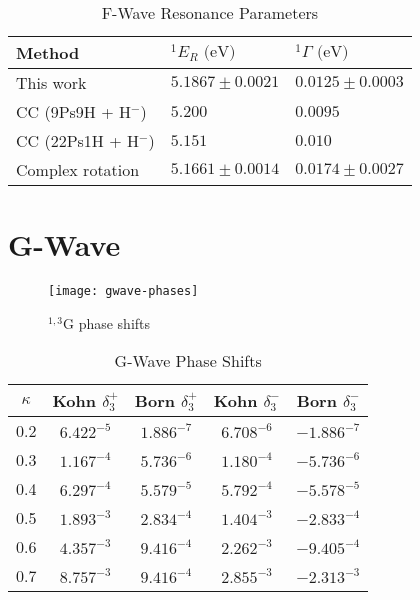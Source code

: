 \documentclass[Dissertation.tex]{subfiles}
\begin{document}
\setlength{\abovecaptionskip}{6pt}   %
\setlength{\belowcaptionskip}{6pt}   %
\begin{table}[H]
\centering
\begin{tabular}{l l l}
\toprule
Method & $^1E_R \text{ (eV)}$ & $^1\Gamma \text{ (eV)}$ \\
\midrule
This work & $5.1867 \pm 0.0021$ & $0.0125 \pm 0.0003$ \\
CC (9Ps9H + H$^-$) \cite{Walters2004} & $5.200$ & $0.0095$ \\
CC (22Ps1H + H$^-$) \cite{Blackwood2002b} & $5.151$ & $0.010$ \\
Complex rotation \cite{Ho2000} & $5.1661 \pm 0.0014$ & $0.0174 \pm 0.0027$  \\
\bottomrule
\end{tabular}
\caption{F-Wave Resonance Parameters}
\label{tab:FWaveResonanceComparisons}
\end{table}




\section{G-Wave}
\label{sec:GWave}

\begin{figure}[H]
	\centering
	\texttt{[image: gwave-phases]}
	\caption{$^{1,3}$G phase shifts}
	\label{fig:GWavePhase}
\end{figure}

\setlength{\abovecaptionskip}{6pt}
\setlength{\belowcaptionskip}{6pt}
\begin{table}[H]
\centering
\begin{tabular}{c | c c | c c}
\toprule
$\kappa$ & Kohn $\delta_3^+$ & Born $\delta_3^+$ & Kohn $\delta_3^-$ & Born $\delta_3^-$ \\
\midrule
0.2 &	$6.422^{-5}$ & $1.886^{-7}$ & $6.708^{-6}$ & $-1.886^{-7}$ \\
0.3 &	$1.167^{-4}$ & $5.736^{-6}$ & $1.180^{-4}$ & $-5.736^{-6}$ \\
0.4 &	$6.297^{-4}$ & $5.579^{-5}$ & $5.792^{-4}$ & $-5.578^{-5}$ \\
0.5 &	$1.893^{-3}$ & $2.834^{-4}$ & $1.404^{-3}$ & $-2.833^{-4}$ \\
0.6 &	$4.357^{-3}$ & $9.416^{-4}$ & $2.262^{-3}$ & $-9.405^{-4}$ \\
0.7 &	$8.757^{-3}$ & $9.416^{-4}$ & $2.855^{-3}$ & $-2.313^{-3}$ \\
\bottomrule
\end{tabular}
\caption{G-Wave Phase Shifts}
\label{tab:GWavePhase}
\end{table}
\end{document}
